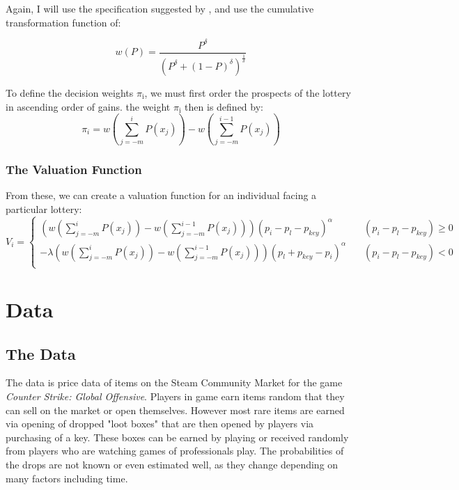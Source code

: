 \documentclass[12pt, letterpaper]{paper}
\begin{document}
Again, I will use the specification suggested by \cite{Kahn}, and use
the cumulative transformation function of:

\begin{equation}
\label{weightFunction}
w(P) = \frac{ P^\delta }{( P^\delta + (1-P)^\delta )^{\frac{1}{\delta}}}
\end{equation}

To define the decision weights $\pi$$_{\text{i}}$, we must first order the prospects
of the lottery in ascending order of gains. the weight $\pi$$_{\text{i}}$ then is
defined by:
\begin{equation}
\label{piWeights}
\pi_i = w( \sum_{j = -m}^i P(x_j)) - w( \sum_{j=-m}^{i-1} P(x_j) )
\end{equation}

\subsubsection{The Valuation Function}
\label{sec-2-3-3}

From these, we can create a valuation function for an individual
facing a particular lottery:
\begin{equation}
\label{Valuation}
V_i = \begin{cases}
(w( \sum_{j = -m}^i P(x_j)) - w( \sum_{j=-m}^{i-1} P(x_j) ))(p_i - p_l - p_{key})^\alpha \quad &(p_i - p_l - p_{key}) \geq 0 \\
-\lambda(w( \sum_{j = -m}^i P(x_j)) - w( \sum_{j=-m}^{i-1} P(x_j) ))(p_l + p_{key} - p_i)^\alpha \quad &(p_i - p_l - p_{key}) < 0 \\
\end{cases}
\end{equation}


\section{Data}
\label{sec-3}
\subsection{The Data}
\label{sec-3-1}
The data is price data of items on the Steam Community Market for
the game \emph{Counter Strike: Global Offensive}. Players in game earn items
random that they can sell on the market or open themselves. However
most rare items are earned via opening of dropped "loot boxes" that
are then opened by players via purchasing of a key. These boxes can be
earned by playing or received randomly from players who are watching
games of professionals play. The probabilities of the drops are not
known or even estimated well, as they change depending on many factors
including time.
\end{document}

